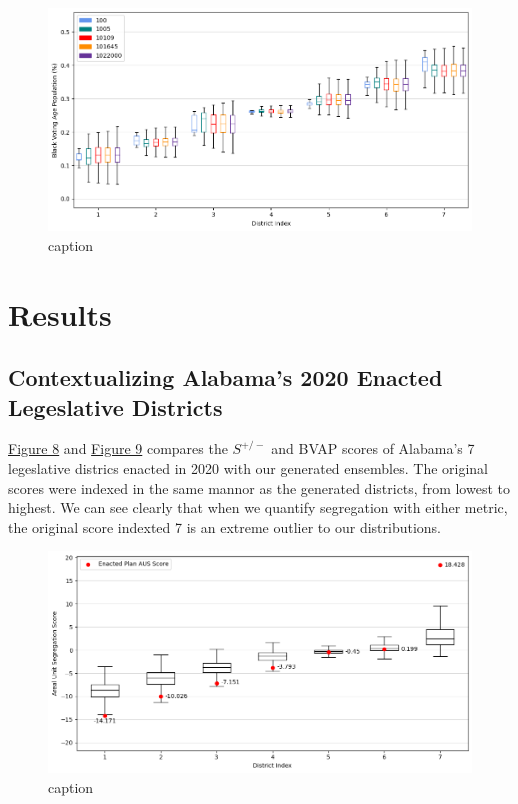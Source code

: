 \documentclass{article}
\begin{document}
\begin{figure}[h]\label{fig 3}
    \centering
    \includegraphics[scale=.5]{images/bvap_bxo_convergence.png}
    \caption{caption}
\end{figure}

\section{Results}\label{results}

\subsection{Contextualizing Alabama's 2020 Enacted Legeslative Districts}


\hyperref[fig 8]{Figure 8} and \hyperref[fig 9]{Figure 9} compares the $S^{+/-}$ and BVAP scores of Alabama's 7 legeslative districs enacted in 2020 with our generated ensembles. The original scores were indexed in the same mannor as the generated districts, from lowest to highest. We can see clearly that when we quantify segregation with either metric, the original score indexted 7 is an extreme outlier to our distributions.      



\begin{figure}[h]\label{fig 8}
    \centering
    \includegraphics[scale=.5]{images/asu_compare.png}
    \caption{caption}
\end{figure}
\end{document}
